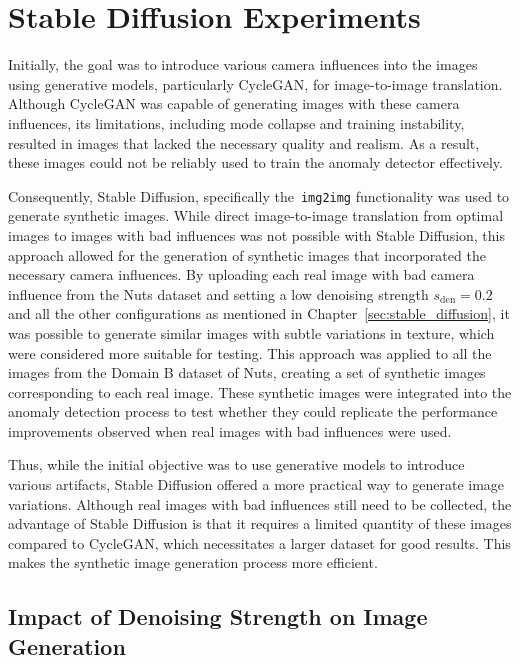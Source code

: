 \documentclass[12pt,DIV14,BCOR12mm,a4paper,footinclude=false,headinclude,parskip=half-,twoside,openright,cleardoublepage=empty,toc=index,bibliography=totoc,listof=totoc]{scrreprt}
\numberwithin{equation}{chapter}
\begin{document}
\section{Stable Diffusion Experiments}

Initially, the goal was to introduce various camera influences into the images using generative models, particularly CycleGAN, for image-to-image translation. Although CycleGAN was capable of generating images with these camera influences, its limitations, including mode collapse and training instability, resulted in images that lacked the necessary quality and realism. As a result, these images could not be reliably used to train the anomaly detector effectively.

Consequently, Stable Diffusion, specifically the~\texttt{img2img} functionality was used to generate synthetic images. While direct image-to-image translation from optimal images to images with bad influences was not possible with Stable Diffusion, this approach allowed for the generation of synthetic images that incorporated the necessary camera influences. By uploading each real image with bad camera influence from the Nuts dataset and setting a low denoising strength $s_{\text{den}} = 0.2$ and all the other configurations as mentioned in Chapter~\ref{sec:stable_diffusion}, it was possible to generate similar images with subtle variations in texture, which were considered more suitable for testing. This approach was applied to all the images from the Domain B dataset of Nuts, creating a set of synthetic images corresponding to each real image. These synthetic images were integrated into the anomaly detection process to test whether they could replicate the performance improvements observed when real images with bad influences were used.

Thus, while the initial objective was to use generative models to introduce various artifacts, Stable Diffusion offered a more practical way to generate image variations. Although real images with bad influences still need to be collected, the advantage of Stable Diffusion is that it requires a limited quantity of these images compared to CycleGAN, which necessitates a larger dataset for good results. This makes the synthetic image generation process more efficient.

\subsection{Impact of Denoising Strength on Image Generation}
\end{document}
